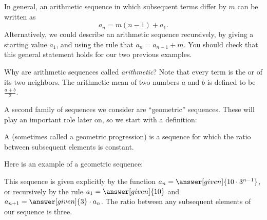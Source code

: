 \documentclass{ximera}
\begin{document}
In general, an arithmetic sequence in which subsequent terms differ
by $m$ can be written as
\[
a_n = m (n-1) + a_1.
\]
Alternatively, we could describe an arithmetic sequence recursively,
by giving a starting value $a_1$, and using the rule that $a_{n} =
a_{n-1} + m$.  You should check that this general statement holds for our 
two previous examples.


\begin{remark}
Why are arithmetic sequences called \textit{arithmetic}?  Note that
every term is the  or  of its two
neighbors.  The arithmetic mean of two numbers $a$ and $b$ is defined
to be $\frac{a+b}{2}$.
\end{remark}



A second family of sequences we consider are ``geometric''
sequences.  These will play an important role later on, so we start with a definition:

\begin{definition}
  A  (sometimes called a geometric
  progression) is a sequence for which the
  ratio between subsequent elements is constant.
\end{definition}

\begin{example}
  Here is an example of a geometric sequence:
  \begin{image}
  \end{image}
  This sequence is given explicitly by the function $a_n=\answer[given]{10\cdot
    3^{n-1}}$, or recursively by the rule $a_1 = \answer[given]{10}$ and
  $a_{n+1} = \answer[given]{3}\cdot a_n$. The ratio between any subsequent elements of our sequence is three.
\end{example}
\end{document}
